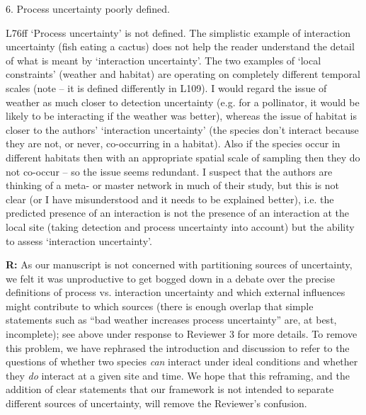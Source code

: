 \documentclass[12pt]{letter}
\newenvironment{refquote}{\bigskip \begin{it}}{\end{it}\smallskip}
\begin{document}
	6. Process uncertainty poorly defined.

		\begin{refquote}
		L76ff `Process uncertainty' is not defined. The simplistic example of interaction uncertainty (fish eating a cactus) does not help the reader understand the detail of what is meant by `interaction uncertainty'. The two examples of `local constraints' (weather and habitat) are operating on completely different temporal scales (note – it is defined differently in L109). I would regard the issue of weather as much closer to detection uncertainty (e.g. for a pollinator, it would be likely to be interacting if the weather was better), whereas the issue of habitat is closer to the authors' `interaction uncertainty' (the species don't interact because they are not, or never, co-occurring in a habitat). Also if the species occur in different habitats then with an appropriate spatial scale of sampling then they do not co-occur – so the issue seems redundant. I suspect that the authors are thinking of a meta- or master network in much of their study, but this is not clear (or I have misunderstood and it needs to be explained better), i.e. the predicted presence of an interaction is not the presence of an interaction at the local site (taking detection and process uncertainty into account) but the ability to assess `interaction uncertainty'.
		\end{refquote}


		\textbf{R:} As our manuscript is not concerned with partitioning sources of uncertainty, we felt it was unproductive to get bogged down in a debate over the precise definitions of process vs. interaction uncertainty and which external influences might contribute to which sources (there is enough overlap that simple statements such as ``bad weather increases process uncertainty'' are, at best, incomplete); see above under response to Reviewer 3 for more details. To remove this problem, we have rephrased the introduction and discussion to refer to the questions of whether two species \emph{can} interact under ideal conditions and whether they \emph{do} interact at a given site and time. We hope that this reframing, and the addition of clear statements that our framework is not intended to separate different sources of uncertainty, will remove the Reviewer's confusion.
\end{document}
